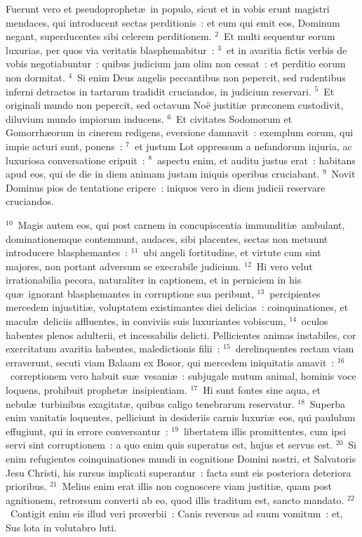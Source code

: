 \bchapter
\lettrine[lines=3,image=true,loversize=0.05,lraise=-0.03]{F}{}uerunt vero et pseudoprophet\ae\ in populo, sicut et in vobis erunt magistri mendaces, qui introducent sectas perditionis~: et eum qui emit eos, Dominum negant, superducentes sibi celerem perditionem.
${}^{2}$~Et multi sequentur eorum luxurias, per quos via veritatis blasphemabitur~:
${}^{3}$~et in avaritia fictis verbis de vobis negotiabuntur~: quibus judicium jam olim non cessat~: et perditio eorum non dormitat.
${}^{4}$~Si enim Deus angelis peccantibus non pepercit, sed rudentibus inferni detractos in tartarum tradidit cruciandos, in judicium reservari.
${}^{5}$~Et originali mundo non pepercit, sed octavum No\"e justiti\ae\ pr\ae conem custodivit, diluvium mundo impiorum inducens.
${}^{6}$~Et civitates Sodomorum et Gomorrh\ae orum in cinerem redigens, eversione damnavit~: exemplum eorum, qui impie acturi sunt, ponens~:
${}^{7}$~et justum Lot oppressum a nefandorum injuria, ac luxuriosa conversatione eripuit~:
${}^{8}$~aspectu enim, et auditu justus erat~: habitans apud eos, qui de die in diem animam justam iniquis operibus cruciabant.
${}^{9}$~Novit Dominus pios de tentatione eripere~: iniquos vero in diem judicii reservare cruciandos.


${}^{10}$~Magis autem eos, qui post carnem in concupiscentia immunditi\ae\ ambulant, dominationemque contemnunt, audaces, sibi placentes, sectas non metuunt introducere blasphemantes~:
${}^{11}$~ubi angeli fortitudine, et virtute cum sint majores, non portant adversum se execrabile judicium.
${}^{12}$~Hi vero velut irrationabilia pecora, naturaliter in captionem, et in perniciem in his qu\ae\ ignorant blasphemantes in corruptione sua peribunt,
${}^{13}$~percipientes mercedem injustiti\ae , voluptatem existimantes diei delicias~: coinquinationes, et macul\ae\ deliciis affluentes, in conviviis suis luxuriantes vobiscum,
${}^{14}$~oculos habentes plenos adulterii, et incessabilis delicti. Pellicientes animas instabiles, cor exercitatum avaritia habentes, maledictionis filii~:
${}^{15}$~derelinquentes rectam viam erraverunt, secuti viam Balaam ex Bosor, qui mercedem iniquitatis amavit~:
${}^{16}$~correptionem vero habuit su\ae\ vesani\ae~: subjugale mutum animal, hominis voce loquens, prohibuit prophet\ae\ insipientiam.
${}^{17}$~Hi sunt fontes sine aqua, et nebul\ae\ turbinibus exagitat\ae , quibus caligo tenebrarum reservatur.
${}^{18}$~Superba enim vanitatis loquentes, pelliciunt in desideriis carnis luxuri\ae\ eos, qui paululum effugiunt, qui in errore conversantur~:
${}^{19}$~libertatem illis promittentes, cum ipsi servi sint corruptionem~: a quo enim quis superatus est, hujus et servus est.
${}^{20}$~Si enim refugientes coinquinationes mundi in cognitione Domini nostri, et Salvatoris Jesu Christi, his rursus implicati superantur~: facta sunt eis posteriora deteriora prioribus.
${}^{21}$~Melius enim erat illis non cognoscere viam justiti\ae , quam post agnitionem, retrorsum converti ab eo, quod illis traditum est, sancto mandato.
${}^{22}$~Contigit enim eis illud veri proverbii~: Canis reversus ad suum vomitum~: et, Sus lota in volutabro luti.

